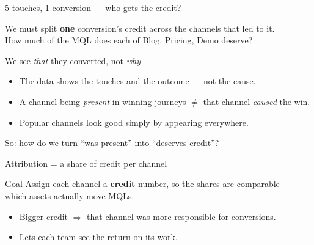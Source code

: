 \documentclass[aspectratio=169]{beamer}
\begin{document}
\begin{frame}{5 touches, 1 conversion --- who gets the credit?}
\centering
\vspace{0.6em}

\vspace{1.0em}
We must split \textbf{one} conversion's credit across the channels that led to it.\\[4pt]
{\small How much of the MQL does each of Blog, Pricing, Demo deserve?}
\end{frame}

\begin{frame}{We see \emph{that} they converted, not \emph{why}}
\vspace{0.4em}
\begin{itemize}
  \itemsep0.7em
  \item The data shows the touches and the outcome --- not the cause.
  \item A channel being \emph{present} in winning journeys $\neq$ that channel \emph{caused} the win.
  \item Popular channels look good simply by appearing everywhere.
\end{itemize}
\vspace{0.8em}
\centering\textcolor{popblue}{So: how do we turn ``was present'' into ``deserves credit''?}
\end{frame}

\begin{frame}{Attribution = a share of credit per channel}
\vspace{0.3em}
\begin{block}{Goal}
Assign each channel a \textbf{credit} number, so the shares are comparable --- which assets actually move MQLs.
\end{block}
\vspace{0.4em}
\begin{itemize}
  \itemsep0.4em
  \item Bigger credit $\Rightarrow$ that channel was more responsible for conversions.
  \item Lets each team see the return on its work.
\end{itemize}
\end{frame}
\end{document}
